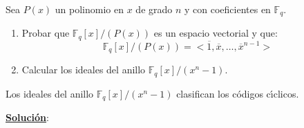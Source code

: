 \begin{ejercicio}\label{ejer:Anillo}
\ \\
Sea $P(x)$ un polinomio en $x$ de grado $n$ y con coeficientes en
$\mathbb{F}_q$.
\begin{enumerate}
\item Probar que $\mathbb{F}_q[x]/(P(x))$ es un espacio vectorial y que:
\begin{displaymath}
\mathbb{F}_q[x]/(P(x))=<\overline{1},\overline{x},\dots,\overline{x}^{n-1}>
\end{displaymath}
\item Calcular los ideales del anillo $\mathbb{F}_q[x]/(x^n-1)$.
\end{enumerate}
Los ideales del anillo $\mathbb{F}_q[x]/(x^n-1)$ clasifican los c\'odigos
c\'{\i}clicos.
\end{ejercicio}
\underline{\textbf{Soluci\'on}}:\\

